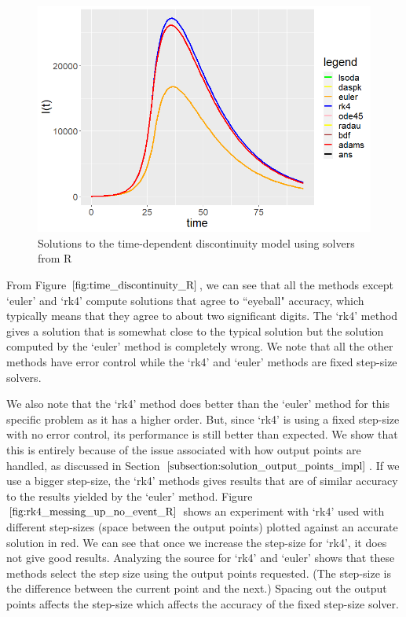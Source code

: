 \begin{figure}[H]
\centering
\includegraphics[width=0.7\linewidth]{./figures/time_discontinuity_R}
\caption{Solutions to the time-dependent discontinuity model using solvers from R}
\label{fig:time_discontinuity_R}
\end{figure}

From Figure $\ref{fig:time_discontinuity_R}$, we can see that all the methods except `euler' and `rk4' compute solutions that agree to ``eyeball" accuracy, which typically means that they agree to about two significant digits. The `rk4' method gives a solution that is somewhat close to the typical solution but the solution computed by the `euler' method is completely wrong. We note that all the other methods have error control while the `rk4' and `euler' methods are fixed step-size solvers.

We also note that the `rk4' method does better than the `euler' method for this specific problem as it has a higher order. But, since `rk4' is using a fixed step-size with no error control, its performance is still better than expected. We show that this is entirely because of the issue associated with how output points are handled, as discussed in Section $\ref{subsection:solution_output_points_impl}$. If we use a bigger step-size, the `rk4' methods gives results that are of similar accuracy to the results yielded by the  `euler' method. Figure $\ref{fig:rk4_messing_up_no_event_R}$ shows an experiment with `rk4' used with different step-sizes (space between the output points) plotted against an accurate solution in red. We can see that once we increase the step-size for `rk4', it does not give good results. Analyzing the source for `rk4' and `euler' shows that these methods select the step size using the output points requested. (The step-size is the difference between the current point and the next.) Spacing out the output points affects the step-size which affects the accuracy of the fixed step-size solver.

